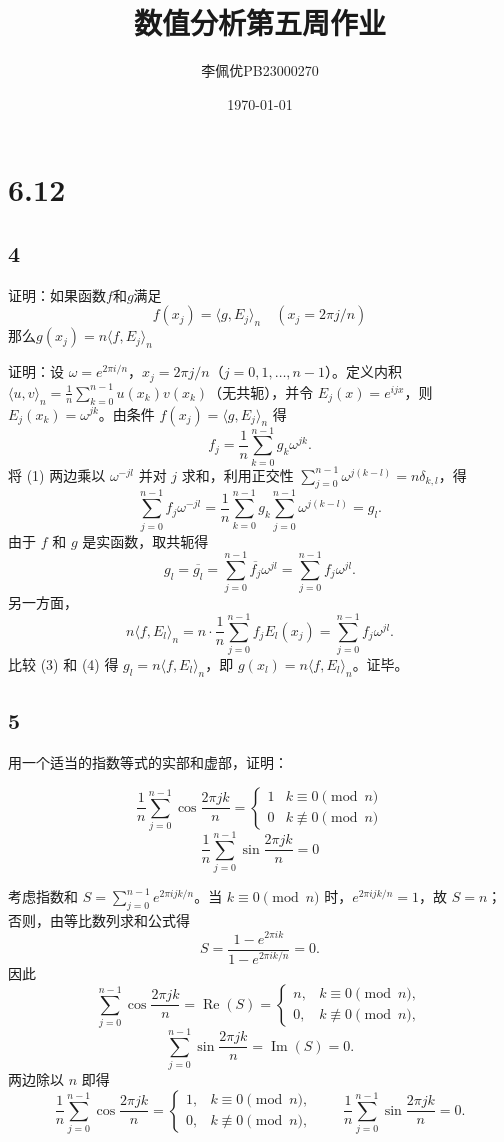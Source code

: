 \documentclass{article}
\title{数值分析第五周作业}
\date{\today}
\author{李佩优PB23000270}
\begin{document}
\maketitle
\section*{6.12}
\subsection*{4}
证明：如果函数$f$和$g$满足
$$f(x_j)=\langle g,E_j \rangle_n  \quad (x_j=2\pi j/n)$$
那么$g(x_j)=n \langle f,E_j \rangle_n$


证明：设 \(\omega = e^{2\pi i/n}\)，\(x_j = 2\pi j/n\)（\(j=0,1,\dots,n-1\)）。定义内积 \(\langle u,v \rangle_n = \frac{1}{n}\sum_{k=0}^{n-1} u(x_k) v(x_k)\)（无共轭），并令 \(E_j(x)=e^{ijx}\)，则 \(E_j(x_k)=\omega^{jk}\)。由条件 \(f(x_j)=\langle g, E_j \rangle_n\) 得
\[
f_j = \frac{1}{n}\sum_{k=0}^{n-1} g_k \omega^{jk}. \tag{1}
\]
将 (1) 两边乘以 \(\omega^{-jl}\) 并对 \(j\) 求和，利用正交性 \(\sum_{j=0}^{n-1} \omega^{j(k-l)} = n\delta_{k,l}\)，得
\[
\sum_{j=0}^{n-1} f_j \omega^{-jl} = \frac{1}{n}\sum_{k=0}^{n-1} g_k \sum_{j=0}^{n-1} \omega^{j(k-l)} = g_l. \tag{2}
\]
由于 \(f\) 和 \(g\) 是实函数，取共轭得
\[
g_l = \overline{g_l} = \sum_{j=0}^{n-1} \overline{f_j} \omega^{jl} = \sum_{j=0}^{n-1} f_j \omega^{jl}. \tag{3}
\]
另一方面，
\[
n\langle f, E_l \rangle_n = n\cdot\frac{1}{n}\sum_{j=0}^{n-1} f_j E_l(x_j) = \sum_{j=0}^{n-1} f_j \omega^{jl}. \tag{4}
\]
比较 (3) 和 (4) 得 \(g_l = n\langle f, E_l \rangle_n\)，即 \(g(x_l)=n\langle f, E_l \rangle_n\)。证毕。

\subsection*{5}

用一个适当的指数等式的实部和虚部，证明：

$$\frac{1}{n}\sum_{j=0}^{n-1} \cos \frac{2\pi jk}{n} = \begin{cases} 1 & k \equiv 0 \pmod{n} \\ 0 & k \not\equiv 0 \pmod{n} \end{cases}$$
$$\frac{1}{n}\sum_{j=0}^{n-1} \sin \frac{2\pi jk}{n} = 0$$

考虑指数和 \(S = \sum_{j=0}^{n-1} e^{2\pi i jk/n}\)。当 \(k \equiv 0 \pmod{n}\) 时，\(e^{2\pi i jk/n}=1\)，故 \(S=n\)；否则，由等比数列求和公式得
\[
S = \frac{1-e^{2\pi i k}}{1-e^{2\pi i k/n}} = 0.
\]
因此
\[
\sum_{j=0}^{n-1} \cos\frac{2\pi jk}{n} = \operatorname{Re}(S) = \begin{cases}
n, & k \equiv 0 \pmod{n},\\
0, & k \not\equiv 0 \pmod{n},
\end{cases}
\]
\[
\sum_{j=0}^{n-1} \sin\frac{2\pi jk}{n} = \operatorname{Im}(S) = 0.
\]
两边除以 \(n\) 即得
\[
\frac{1}{n}\sum_{j=0}^{n-1} \cos\frac{2\pi jk}{n} = \begin{cases}
1, & k \equiv 0 \pmod{n},\\
0, & k \not\equiv 0 \pmod{n},
\end{cases}
\qquad
\frac{1}{n}\sum_{j=0}^{n-1} \sin\frac{2\pi jk}{n} = 0.
\]
\end{document}

